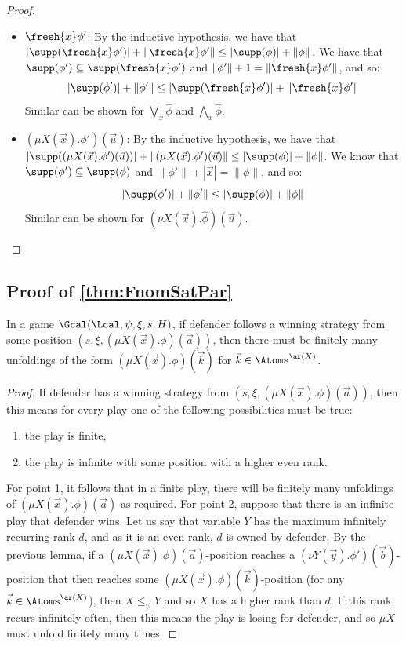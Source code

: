 \begin{proof}
\begin{enumerate}
\begin{itemize}
						\item $\fresh{x} \phi'$: By the inductive hypothesis, we have that $|\supp(\fresh{x} \phi')| + \|\fresh{x} \phi'\| \le |\supp(\phi)| + \|\phi\|$. 
			We have that $\supp(\phi') \subseteq \supp(\fresh{x} \phi')$ and $\|\phi'\| + 1= \|\fresh{x}\phi' \|$, and so:
			\[
				|\supp(\phi')| + \|\phi'\| \le |\supp(\fresh{x}\phi')| + \|\fresh{x}\phi'\|
			\]
			Similar can be shown for $\bigvee_x \hat \phi$ and $\bigwedge_x \hat \phi$.
						\item $(\mu X(\vec x).\phi')(\vec u)$: By the inductive hypothesis, we have that $|\supp((\mu X(\vec x).\phi')(\vec u))| + \|(\mu X(\vec x).\phi')(\vec u)\| \le |\supp(\phi)| + \|\phi\|$. 
			We know that $\supp(\phi') \subseteq \supp(\phi)$ and $\|\phi'\| + |\vec x| = \|\phi\|$, and so:
			\[
				|\supp(\phi')| + \|\phi'\| \le |\supp(\phi)| + \|\phi\|
			\]
			Similar can be shown for $(\nu X(\vec x).\hat \phi)(\vec u)$.
		\end{itemize}
	\end{enumerate}
\end{proof}

\subsection{Proof of \cref{thm:FnomSatPar}}

\begin{lemma}\label{lem:parityNom}
	In a game $\Gcal(\Lcal, \psi, \xi, s, H)$, if defender follows a winning strategy from some position $(s, \xi, (\mu X(\vec x).\phi)(\vec a))$,
	then there must be finitely many unfoldings of the form $(\mu X(\vec x).\phi)(\vec k)$ for $\vec k \in \Atoms^{\ar(X)}$. 
\end{lemma}
\begin{proof}
	If defender has a winning strategy from $(s, \xi, (\mu X(\vec x).\phi)(\vec a))$, then this means for every play one of the following possibilities must be true:
	\begin{enumerate}
		\item the play is finite,
		\item the play is infinite with some position with a higher even rank.
	\end{enumerate}
	For point 1, it follows that in a finite play, there will be finitely many unfoldings of $(\mu X(\vec x).\phi)(\vec a)$ as required.
	For point 2, suppose that there is an infinite play that defender wins.
	Let us say that variable $Y$ has the maximum infinitely recurring rank $d$, and as it is an even rank, $d$ is owned by defender.
	By the previous lemma, if a $(\mu X(\vec x).\phi)(\vec a)$-position reaches a $(\nu Y(\vec y).\phi')(\vec b)$-position that then reaches some $(\mu X(\vec x).\phi)(\vec k)$-position (for any $\vec k \in \Atoms^{\ar(X)}$), then $X \le_\psi Y$ and so $X$ has a higher rank than $d$.
	If this rank recurs infinitely often, then this means the play is losing for defender, and so $\mu X$ must unfold finitely many times.
\end{proof}

